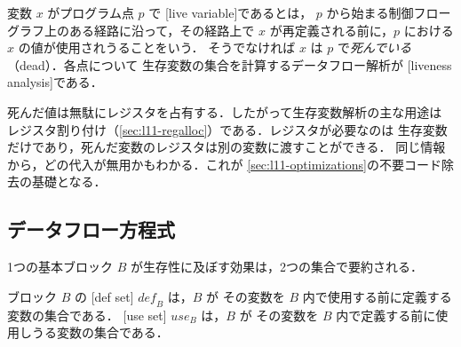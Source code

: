 \documentclass[../main.tex]{subfiles}
\begin{document}
\begin{definition}[生存変数]
  \label{def:l11-live}
  変数 $x$ がプログラム点 $p$ で
  [live variable]であるとは，
  $p$ から始まる制御フローグラフ上のある経路に沿って，その経路上で
  $x$ が再定義される前に，$p$ における $x$ の値が使用されうることをいう．
  そうでなければ $x$ は $p$ で\emph{死んでいる}（dead）．各点について
  生存変数の集合を計算するデータフロー解析が
  [liveness analysis]である．
\end{definition}

%
死んだ値は無駄にレジスタを占有する．したがって生存変数解析の主な用途は
レジスタ割り付け（\cref{sec:l11-regalloc}）である．レジスタが必要なのは
生存変数だけであり，死んだ変数のレジスタは別の変数に渡すことができる．
同じ情報から，どの代入が無用かもわかる．これが
\cref{sec:l11-optimizations}の不要コード除去の基礎となる．

\subsection{データフロー方程式}

1つの基本ブロック $B$ が生存性に及ぼす効果は，2つの集合で要約される．

\begin{definition}
  \label{def:l11-def-use}
  ブロック $B$ の
  [def set] $\mathit{def}_B$ は，$B$ が
  その変数を $B$ 内で使用する前に定義する変数の集合である．
  [use set] $\mathit{use}_B$ は，$B$ が
  その変数を $B$ 内で定義する前に使用しうる変数の集合である．
\end{definition}
\end{document}
